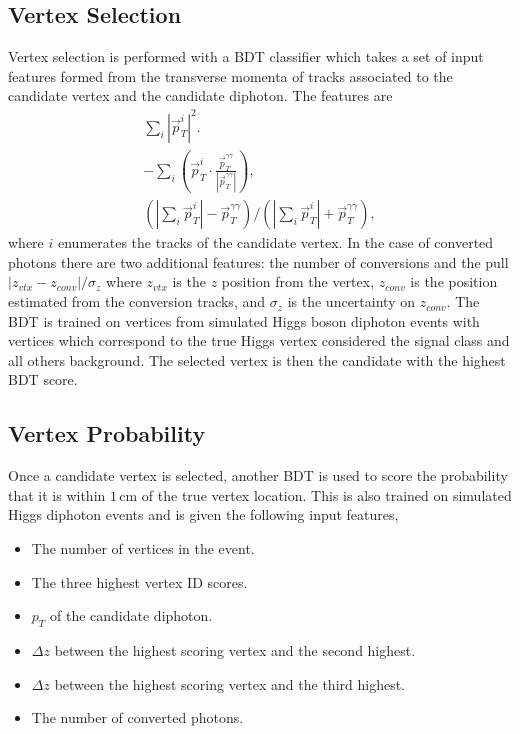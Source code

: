 \subsection{Vertex Selection}
Vertex selection is performed with a BDT classifier which takes a set of input features formed from the transverse momenta of tracks associated to the candidate vertex and the candidate diphoton. The features are
\begin{gather*}
    \sum_{i}|\vec{p}_{T}^{i}|^{2}. \\
    -\sum_{i}(\vec{p}_{T}^{i}\cdot\frac{\vec{p}_{T}^{\gamma\gamma}}{|\vec{p}_{T}^{\gamma\gamma}|}), \\
    (|\sum_{i}\vec{p}_{T}^{i}|-\vec{p}_{T}^{\gamma\gamma})/(|\sum_{i}\vec{p}_{T}^{i}|+\vec{p}_{T}^{\gamma\gamma}),
\end{gather*}
where $i$ enumerates the tracks of the candidate vertex. In the case of converted photons there are two additional features: the number of conversions and the pull $|z_{vtx} - z_{conv}|/\sigma_{z}$ where $z_{vtx}$ is the $z$ position from the vertex, $z_{conv}$ is the position estimated from the conversion tracks, and $\sigma_z$ is the uncertainty on $z_{conv}$.
The BDT is trained on vertices from simulated Higgs boson diphoton events with vertices which correspond to the true Higgs vertex considered the signal class and all others background. The selected vertex is then the candidate with the highest BDT score. 


\subsection{Vertex Probability}
Once a candidate vertex is selected, another BDT is used to score the probability that it is within $1$\,cm of the true vertex location.   
This is also trained on simulated Higgs diphoton events and is given the following input features,
\begin{itemize}[leftmargin=.5in,noitemsep]
    \item The number of vertices in the event.
    \item The three highest vertex ID scores.
    \item $p_{T}$ of the candidate diphoton.
    \item $\Delta{z}$ between the highest scoring vertex and the second highest.
    \item $\Delta{z}$ between the highest scoring vertex and the third highest.
    \item The number of converted photons.
\end{itemize}


